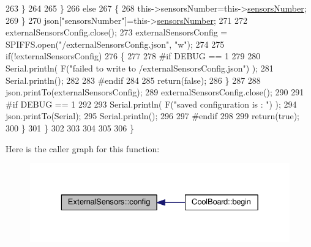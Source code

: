 \begin{DoxyCode}
263                 \}
264  
265             \}
266             \textcolor{keywordflow}{else}
267             \{
268                 this->sensorsNumber=this->\hyperlink{class_external_sensors_a58e4fbf9adeae787d92be5fa33043b5d}{sensorsNumber};
269             \}
270             json[\textcolor{stringliteral}{"sensorsNumber"}]=this->\hyperlink{class_external_sensors_a58e4fbf9adeae787d92be5fa33043b5d}{sensorsNumber};
271 
272             externalSensorsConfig.close();
273             externalSensorsConfig = SPIFFS.open(\textcolor{stringliteral}{"/externalSensorsConfig.json"}, \textcolor{stringliteral}{"w"});
274 
275             \textcolor{keywordflow}{if}(!externalSensorsConfig)
276             \{
277             
278 \textcolor{preprocessor}{            #if DEBUG == 1 }
279 
280                 Serial.println( F(\textcolor{stringliteral}{"failed to write to /externalSensorsConfig.json"}) );
281                 Serial.println();
282             
283 \textcolor{preprocessor}{            #endif}
284 
285                 \textcolor{keywordflow}{return}(\textcolor{keyword}{false});
286             \}
287             
288             json.printTo(externalSensorsConfig);
289             externalSensorsConfig.close();
290             
291 \textcolor{preprocessor}{        #if DEBUG == 1 }
292 
293             Serial.println( F(\textcolor{stringliteral}{"saved configuration is : "}) );
294             json.printTo(Serial);
295             Serial.println();
296         
297 \textcolor{preprocessor}{        #endif}
298 
299             \textcolor{keywordflow}{return}(\textcolor{keyword}{true}); 
300         \}
301     \}   
302     
303 
304 
305 
306 \}
\end{DoxyCode}
Here is the caller graph for this function\+:\nopagebreak
\begin{figure}[H]
\begin{center}
\leavevmode
\includegraphics[width=329pt]{d1/d2f/class_external_sensors_a862a4bd11346b37270d0244c2adabe5a_icgraph}
\end{center}
\end{figure}
\mbox{\label{class_external_sensors_ac829858f587e15a3fcb00567248f0edd}} 
